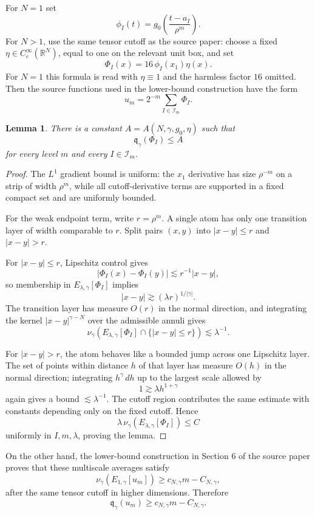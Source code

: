 \documentclass[11pt]{article}
\newcommand{\R}{\mathbb R}
\newcommand{\qg}{\mathfrak q_\gamma}
\newtheorem{lemma}{Lemma}
\begin{document}
For $N=1$ set
\[
\phi_I(t)=g_0\!\left(\frac{t-a_I}{\rho^m}\right).
\]
For $N>1$, use the same tensor cutoff as the source paper: choose a fixed $\eta\in C_c^\infty(\R^N)$, equal to one on the relevant unit box, and set
\[
\Phi_I(x)=16\,\phi_I(x_1)\eta(x).
\]
For $N=1$ this formula is read with $\eta\equiv 1$ and the harmless factor $16$ omitted. Then the source functions used in the lower-bound construction have the form
\[
u_m=2^{-m}\sum_{I\in\mathcal I_m}\Phi_I .
\]

\begin{lemma}
There is a constant $A=A(N,\gamma,g_0,\eta)$ such that
\[
\qg(\Phi_I)\le A
\]
for every level $m$ and every $I\in\mathcal I_m$.
\end{lemma}

\begin{proof}
The $L^1$ gradient bound is uniform: the $x_1$ derivative has size $\rho^{-m}$ on a strip of width $\rho^m$, while all cutoff-derivative terms are supported in a fixed compact set and are uniformly bounded.

For the weak endpoint term, write $r=\rho^m$. A single atom has only one transition layer of width comparable to $r$. Split pairs $(x,y)$ into $|x-y|\le r$ and $|x-y|>r$.

For $|x-y|\le r$, Lipschitz control gives
\[
|\Phi_I(x)-\Phi_I(y)|\lesssim r^{-1}|x-y|,
\]
so membership in $E_{\lambda,\gamma}[\Phi_I]$ implies
\[
|x-y|\gtrsim(\lambda r)^{1/|\gamma|}.
\]
The transition layer has measure $O(r)$ in the normal direction, and integrating the kernel $|x-y|^{\gamma-N}$ over the admissible annuli gives
\[
\nu_\gamma(E_{\lambda,\gamma}[\Phi_I]\cap\{|x-y|\le r\})\lesssim \lambda^{-1}.
\]

For $|x-y|>r$, the atom behaves like a bounded jump across one Lipschitz layer. The set of points within distance $h$ of that layer has measure $O(h)$ in the normal direction; integrating $h^\gamma\,dh$ up to the largest scale allowed by
\[
1\gtrsim \lambda h^{1+\gamma}
\]
again gives a bound $\lesssim \lambda^{-1}$. The cutoff region contributes the same estimate with constants depending only on the fixed cutoff. Hence
\[
\lambda\,\nu_\gamma(E_{\lambda,\gamma}[\Phi_I])\le C
\]
uniformly in $I,m,\lambda$, proving the lemma.
\end{proof}

On the other hand, the lower-bound construction in Section 6 of the source paper proves that these multiscale averages satisfy
\[
\nu_\gamma(E_{1,\gamma}[u_m])\ge c_{N,\gamma}m-C_{N,\gamma},
\]
after the same tensor cutoff in higher dimensions. Therefore
\[
\qg(u_m)\ge c_{N,\gamma}m-C_{N,\gamma}.
\]
\end{document}

